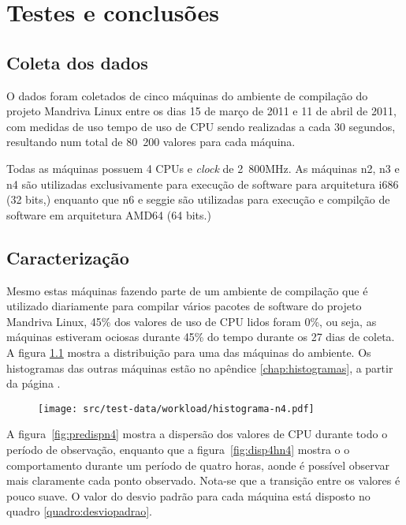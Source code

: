 \chapter{Testes e conclusões}\label{sec:resultados}

\section{Coleta dos dados}\label{sec:coleta}

O dados foram coletados de cinco máquinas do ambiente de compilação do
projeto Mandriva Linux entre os dias 15 de março de 2011 e 11 de abril de
2011, com medidas de uso tempo de uso de CPU sendo realizadas a cada 30
segundos, resultando num total de 80~200 valores para cada máquina.

Todas as máquinas possuem 4 CPUs e \emph{clock} de 2~800MHz. As máquinas n2,
n3 e n4 são utilizadas exclusivamente para execução de software para
arquitetura i686 (32 bits,) enquanto que n6 e seggie são utilizadas para
execução e compilção de software em arquitetura AMD64 (64 bits.)

\section{Caracterização}

Mesmo estas máquinas fazendo parte de um ambiente de compilação que é
utilizado diariamente para compilar vários pacotes de software do projeto
Mandriva Linux, 45\% dos valores de uso de CPU lidos foram 0\%, ou seja,
as máquinas estiveram ociosas durante 45\% do tempo durante os 27 dias de
coleta. A figura \ref{fig:prehistn4} mostra a distribuição para uma das
máquinas do ambiente. Os histogramas das outras máquinas estão no apêndice
\ref{chap:histogramas}, a partir da página \pageref{chap:histogramas}.

\begin{figure}[htp]
\centering
\texttt{[image: src/test-data/workload/histograma-n4.pdf]}
\label{fig:prehistn4}
\end{figure}


A figura~\ref{fig:predispn4} mostra a dispersão dos valores de CPU durante
todo o período de observação, enquanto que a figura~\ref{fig:disp4hn4}
mostra o o comportamento durante um período de quatro horas, aonde é
possível observar mais claramente cada ponto observado. Nota-se que a
transição entre os valores é pouco suave. O valor do desvio padrão para
cada máquina está disposto no quadro \ref{quadro:desviopadrao}.

